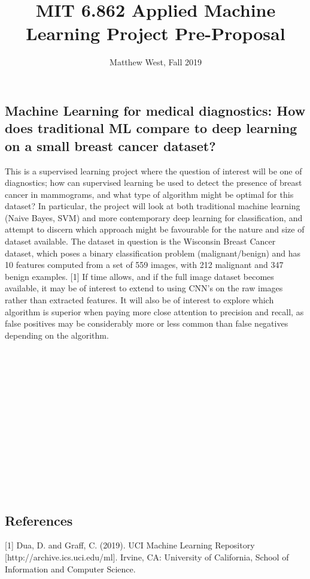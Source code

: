 \documentclass[11pt]{article}
\title{MIT 6.862 Applied Machine Learning Project Pre-Proposal}
\author{Matthew West, Fall 2019}
\begin{document}
\date{}
\maketitle

\subsection*{Machine Learning for medical diagnostics: How does traditional ML compare to deep learning on a small breast cancer dataset?}
This is a supervised learning project where the question of interest will be one of diagnostics; how can supervised learning be used to detect the presence of breast cancer in mammograms, and what type of algorithm might be optimal for this dataset? In particular, the project will look at both traditional machine learning (Naive Bayes, SVM) and more contemporary deep learning for classification, and attempt to discern which approach might be favourable for the nature and size of dataset available. The dataset in question is the Wisconsin Breast Cancer dataset, which poses a binary classification problem (malignant/benign) and has 10 features computed from a set of 559 images, with 212 malignant and 347 benign examples. [1] If time allows, and if the full image dataset becomes available, it may be of interest to extend to using CNN's on the raw images rather than extracted features. It will also be of interest to explore which algorithm is superior when paying more close attention to precision and recall, as false positives may be considerably more or less common than false negatives depending on the algorithm.\\\\\\\\\\\\\\\\\\\\\\\\\\\\

\subsection*{References}
[1] Dua, D. and Graff, C. (2019). UCI Machine Learning Repository [http://archive.ics.uci.edu/ml]. Irvine, CA: University of California, School of Information and Computer Science.
\end{document}
